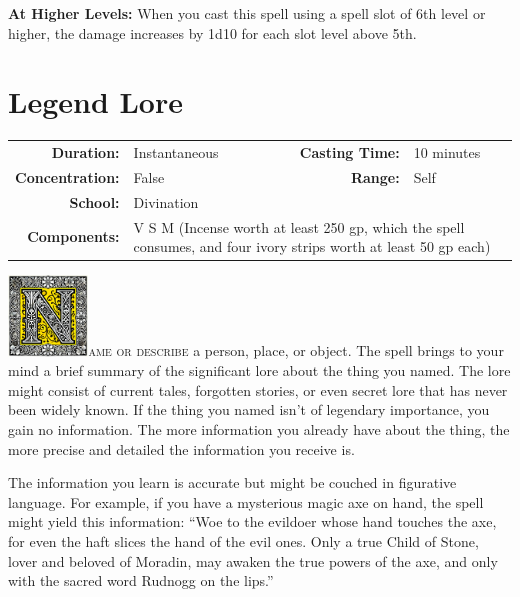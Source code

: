 \documentclass[12pt,showtrims]{memoir}
\begin{document}
\vspace{8pt} \noindent\textbf{At Higher Levels:} When you cast this spell using a spell slot of 6th level or higher, the damage increases by 1d10 for each slot level above 5th.
\newpage
\section*{Legend Lore}
{
\small\centering\vspace{-6pt}
\begin{tabular}{rlrl}
\toprule

\textbf{Duration:} &Instantaneous  &
\textbf{Casting Time:} & 10 minutes \\
\textbf{Concentration:} & False &
\textbf{Range:} & Self \\
\textbf{School:} & Divination \\
\textbf{Components:} & \multicolumn{3}{p{0.7\textwidth}}{V S M (Incense worth at least 250 gp, which the spell consumes, and four ivory strips worth at least 50 gp each)}\\
\bottomrule
\end{tabular}
}

\vspace{1\baselineskip}\noindent
\lettrine[lines=4]{\includegraphics[height=61pt]{initials/N.png}}{ame or
describe} a person, place, or object. The spell brings to your mind a brief
summary of the significant lore about the thing you named. The lore might
consist of current tales, forgotten stories, or even secret lore that has never
been widely known. If the thing you named isn’t of legendary importance, you
gain no information. The more information you already have about the thing, the
more precise and detailed the information you receive is.

The information you learn is accurate but might be couched in figurative
language. For example, if you have a mysterious magic axe on hand, the spell
might yield this information: ``Woe to the evildoer whose hand touches the axe,
for even the haft slices the hand of the evil ones. Only a true Child of Stone,
lover and beloved of Moradin, may awaken the true powers of the axe, and
only with the sacred word Rudnogg on the lips.''

\newpage
\end{document}

